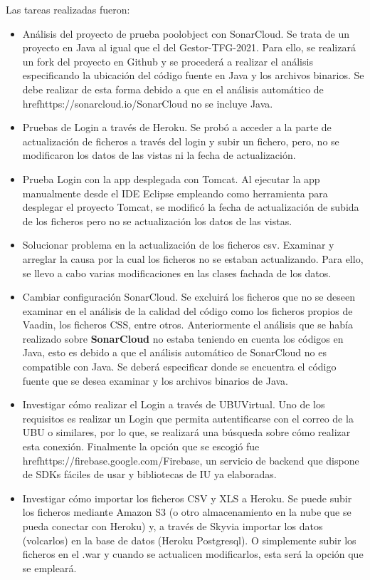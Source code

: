 Las tareas realizadas fueron:
\begin{itemize}
	\tightlist
	\item Análisis del proyecto de prueba poolobject con SonarCloud.
		Se trata de un proyecto en Java al igual que el del Gestor-TFG-2021. Para ello, se realizará un fork del proyecto en Github y se procederá a realizar el análisis especificando la ubicación del código fuente en Java y los archivos binarios. Se debe realizar de esta forma debido a que en el análisis automático de href{https://sonarcloud.io/}{SonarCloud} no se incluye Java.
	\item Pruebas de Login a través de Heroku. 
		Se probó a acceder a la parte de actualización de ficheros a través del login y subir un fichero, pero, no se modificaron los datos de las vistas ni la fecha de actualización.
	\item Prueba Login con la app desplegada con Tomcat. 
		Al ejecutar la app manualmente desde el IDE Eclipse empleando como herramienta para desplegar el proyecto Tomcat, se modificó la fecha de actualización de subida de los ficheros pero no se actualización los datos de las vistas.
	\item Solucionar problema en la actualización de los ficheros csv.
		 Examinar y arreglar la causa por la cual los ficheros no se estaban actualizando. Para ello, se llevo a cabo varias modificaciones en las clases fachada de los datos.
	\item Cambiar configuración SonarCloud. 
		Se excluirá los ficheros que no se deseen examinar en el análisis de la calidad del código como los ficheros propios de Vaadin, los ficheros CSS, entre otros. Anteriormente el análisis que se había realizado sobre \textbf{SonarCloud} no estaba teniendo en cuenta los códigos en Java, esto es debido a que el análisis automático de SonarCloud no es compatible con Java. Se deberá especificar donde se encuentra el código fuente que se desea examinar y los archivos binarios de Java.
	\item Investigar cómo realizar el Login a través de UBUVirtual. 
		Uno de los requisitos es realizar un Login que permita autentificarse con el correo de la UBU o similares, por lo que, se realizará una búsqueda sobre cómo realizar esta conexión. Finalmente la opción que se escogió fue href{https://firebase.google.com/}{Firebase}, un servicio de backend que dispone de SDKs fáciles de usar y bibliotecas de IU ya elaboradas.
	\item Investigar cómo importar los ficheros CSV y XLS a Heroku.
		Se puede subir los ficheros mediante Amazon S3 (o otro almacenamiento en la nube que se pueda conectar con Heroku) y, a través de Skyvia importar los datos (volcarlos) en la base de datos (Heroku Postgresql). O simplemente subir los ficheros en el .war y cuando se actualicen modificarlos, esta será la opción que se empleará.

\end{itemize}
